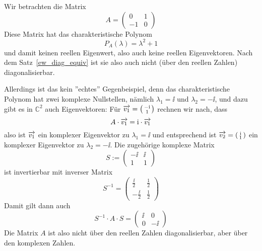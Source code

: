 \begin{beispiel}\label{linalg_ev_diag_komplex} Wir betrachten die Matrix
 	$$ A =  \left( \begin{matrix} 0 & 1  \\ -1  & 0  \end{matrix} \right) $$
Diese Matrix hat das charakteristische Polynom
  	$$ P_A(\lambda) = \lambda^2 + 1 $$
und damit keinen reellen Eigenwert, also auch keine reellen Eigenvektoren. Nach dem 
Satz~\ref{ew_diag_equiv} ist sie also auch nicht (über den reellen Zahlen) diagonalisierbar. 

Allerdings ist das kein ''echtes'' Gegenbeispiel, denn das charakteristische Polynom hat zwei komplexe 
Nullstellen, nämlich $\lambda_1 = \ii$ und $\lambda_2 = -\ii$, und dazu gibt es in $\mathbb C^2$ auch Eigenvektoren: 
Für $\vektor{v_1} = \left( \begin{smallmatrix} - \ii \\ 1 \end{smallmatrix} \right)$ rechnen wir nach, dass
  	$$ A \cdot \vektor{v_1} = \ii \cdot \vektor{v_1} $$
also ist $\overrightarrow{v_1}$ ein komplexer Eigenvektor zu $\lambda_1 = \ii$ und entsprechend ist 
$\vektor{v_2} = \left( \begin{smallmatrix} \ii \\ 1 \end{smallmatrix} \right)$ ein komplexer 
Eigenvektor zu $\lambda_2 = -\ii$. Die 
zugehörige komplexe Matrix
  	$$ S := \left( \begin{matrix} -\ii & \ii \\ 1 & 1 \end{matrix} \right) $$
ist  invertierbar mit inverser Matrix
  	$$ S^{-1} = \left( \begin{matrix} \frac {\ii}{2} & \frac {1}{2} \\ - \frac {\ii}{2} & \frac {1}{2} \end{matrix} \right) $$
Damit gilt dann auch
  	$$ S^{-1} \cdot A \cdot S = \left( \begin{matrix} \ii & 0 \\ 0 & -\ii \end{matrix} \right) $$
Die Matrix $A$ ist also nicht über den reellen Zahlen diagonalisierbar, aber über den komplexen Zahlen.
\end{beispiel} 


